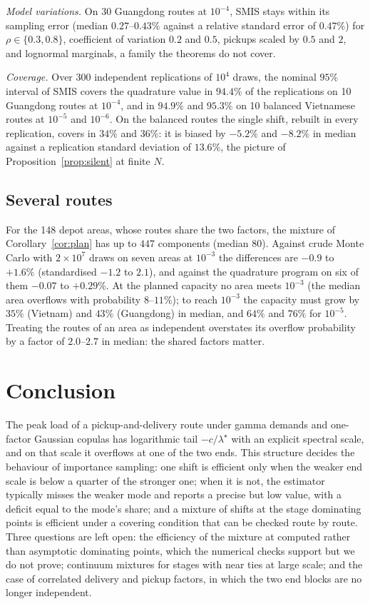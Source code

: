 \documentclass[11pt]{article}
\theoremstyle{definition}
\theoremstyle{remark}
\begin{document}
\emph{Model variations.} On 30 Guangdong routes at $10^{-4}$, SMIS stays within its
sampling error (median $0.27$--$0.43\%$ against a relative standard error of $0.47\%$)
for $\rho\in\{0.3,0.8\}$, coefficient of variation $0.2$ and $0.5$, pickups scaled by
$0.5$ and $2$, and lognormal marginals, a family the theorems do not cover.

\emph{Coverage.} Over 300 independent replications of $10^4$ draws, the nominal $95\%$
interval of SMIS covers the quadrature value in $94.4\%$ of the replications on 10
Guangdong routes at $10^{-4}$, and in $94.9\%$ and $95.3\%$ on 10 balanced Vietnamese
routes at $10^{-5}$ and $10^{-6}$. On the balanced routes the single shift, rebuilt in
every replication, covers in $34\%$ and $36\%$: it is biased by $-5.2\%$ and $-8.2\%$ in
median against a replication standard deviation of $13.6\%$, the picture of
Proposition~\ref{prop:silent} at finite $N$.

\subsection{Several routes}
For the 148 depot areas, whose routes share the two factors, the mixture of
Corollary~\ref{cor:plan} has up to $447$ components (median $80$). Against crude Monte
Carlo with $2\times10^7$ draws on seven areas at $10^{-3}$ the differences are $-0.9$ to
$+1.6\%$ (standardised $-1.2$ to $2.1$), and against the quadrature program on six of them
$-0.07$ to $+0.29\%$. At the planned capacity no area meets $10^{-3}$ (the median area
overflows with probability $8$--$11\%$); to reach $10^{-3}$ the capacity must grow by
$35\%$ (Vietnam) and $43\%$ (Guangdong) in median, and $64\%$ and $76\%$ for $10^{-5}$.
Treating the routes of an area as independent overstates its overflow probability by a
factor of $2.0$--$2.7$ in median: the shared factors matter.

\section{Conclusion}
\label{sec:conclusion}

The peak load of a pickup-and-delivery route under gamma demands and one-factor Gaussian
copulas has logarithmic tail $-c/\lambda^\star$ with an explicit spectral scale, and on
that scale it overflows at one of the two ends. This structure decides the behaviour of
importance sampling: one shift is efficient only when the weaker end scale is below a
quarter of the stronger one; when it is not, the estimator typically misses the weaker
mode and reports a precise but low value, with a deficit equal to the mode's share; and
a mixture of shifts at the stage dominating points is efficient under a covering
condition that can be checked route by route. Three questions are left open: the
efficiency of the mixture at computed rather than asymptotic dominating points, which
the numerical checks support but we do not prove; continuum mixtures for stages with
near ties at large scale; and the case of correlated delivery and pickup factors, in
which the two end blocks are no longer independent.
\end{document}
